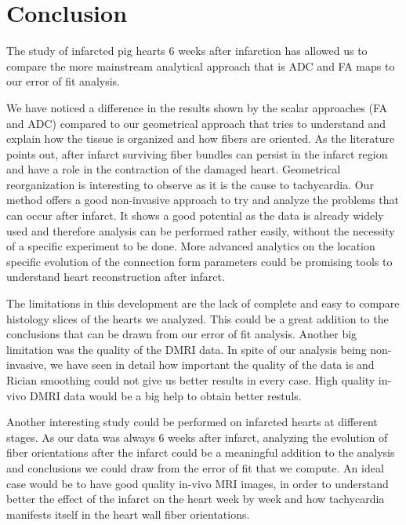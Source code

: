 \chapter{Conclusion}

The study of infarcted pig hearts 6 weeks after infarction has allowed us to compare the more mainstream analytical approach that is ADC and FA maps to our error of fit analysis.

We have noticed a difference in the results shown by the scalar approaches (FA and ADC) compared to our geometrical approach that tries to understand and explain how the tissue is organized and how fibers are oriented. As the literature points out, after infarct surviving fiber bundles can persist in the infarct region and have a role in the contraction of the damaged heart. Geometrical reorganization is interesting to observe as it is the cause to tachycardia. Our method offers a good non-invasive approach to try and analyze the problems that can occur after infarct. It shows a good potential as the data is already widely used and therefore analysis can be performed rather easily, without the necessity of a specific experiment to be done. More advanced analytics on the location specific evolution of the connection form parameters could be promising tools to understand heart reconstruction after infarct.

The limitations in this development are the lack of complete and easy to compare histology slices of the hearts we analyzed. This could be a great addition to the conclusions that can be drawn from our error of fit analysis. Another big limitation was the quality of the DMRI data. In spite of our analysis being non-invasive, we have seen in detail how important the quality of the data is and Rician smoothing could not give us better results in every case. High quality in-vivo DMRI data would be a big help to obtain better restuls.

Another interesting study could be performed on infarcted hearts at different stages. As our data was always 6 weeks after infarct, analyzing the evolution of fiber orientations after the infarct could be a meaningful addition to the analysis and conclusions we could draw from the error of fit that we compute. An ideal case would be to have good quality in-vivo MRI images, in order to understand better the effect of the infarct on the heart week by week and how tachycardia manifests itself in the heart wall fiber orientations.